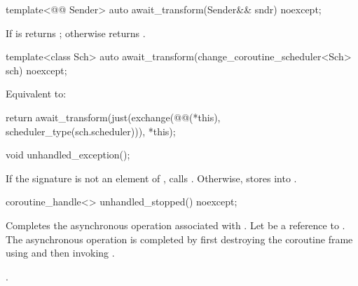 %
\begin{itemdecl}
template<@@ Sender>
  auto await_transform(Sender&& sndr) noexcept;
\end{itemdecl}
\begin{itemdescr}
\pnum
\returns
If  is 
returns ;
otherwise returns
.
\end{itemdescr}

%
\begin{itemdecl}
template<class Sch>
  auto await_transform(change_coroutine_scheduler<Sch> sch) noexcept;
\end{itemdecl}
\begin{itemdescr}
\pnum
\effects
Equivalent to:
\begin{codeblock}
return await_transform(just(exchange(@@(*this), scheduler_type(sch.scheduler))), *this);
\end{codeblock}
\end{itemdescr}

%
\begin{itemdecl}
void unhandled_exception();
\end{itemdecl}
\begin{itemdescr}
\pnum
\effects
If the signature  is not an element
of , calls .
Otherwise, stores  into
.
\end{itemdescr}

%
\begin{itemdecl}
coroutine_handle<> unhandled_stopped() noexcept;
\end{itemdecl}
\begin{itemdescr}
\pnum
\effects
Completes the asynchronous operation associated with .
Let  be a reference to .
The asynchronous operation is completed by first
destroying the coroutine frame
using  and then
invoking .
\end{itemdescr}
\begin{itemdescr}
\pnum
\returns
{}.
\end{itemdescr}


